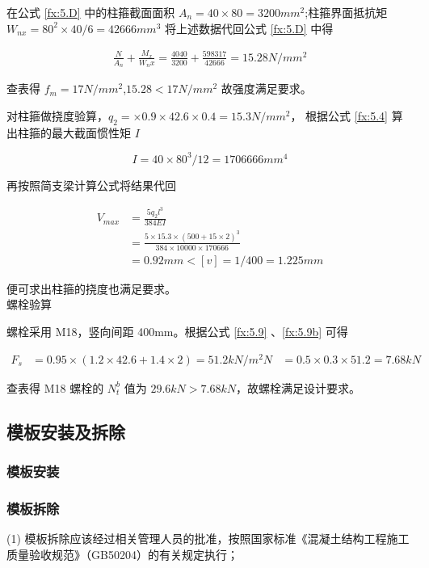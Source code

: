 在公式 \ref{fx:5.D} 中的柱箍截面面积 $A_n=40\times 80=3200 mm^2$;柱箍界面抵抗矩 $W_{nx}=80^2\times 40/6=42666 mm^3$
将上述数据代回公式 \ref{fx:5.D} 中得

\begin{align*}
    \frac{N}{A_n}+\frac{M_x}{W_nx}=\frac{4040}{3200}+\frac{598317}{42666}=15.28 N/mm^2
\end{align*}

查表得 $f_m=17N/mm^2$,$15.28<17N/mm^2$ 故强度满足要求。

对柱箍做挠度验算，$q_2=\times 0.9\times 42.6\times 0.4=15.3 N/mm^2$，
根据公式 \ref{fx:5.4} 算出柱箍的最大截面惯性矩 $I$

\[
    I=40\times 80^3 /12=1706666 mm^4
\]

再按照简支梁计算公式将结果代回

\begin{align*}
    V_{max}&=\frac{5q_2l^3}{384EI}\\
    &=\frac{5\times 15.3\times (500+15\times 2)^3}{384\times 10000\times 170666}\\
    &=0.92mm<[v]=1/400=1.225mm
\end{align*}

便可求出柱箍的挠度也满足要求。\\

 螺栓验算

螺栓采用 M18，竖向间距 400mm。根据公式 \ref{fx:5.9} 、\ref{fx:5.9b} 可得

\begin{align*}
    F_s&=0.95\times(1.2\times 42.6+1.4\times 2)=51.2 kN/m^2
    N&=0.5\times 0.3\times 51.2=7.68 kN
\end{align*}

查表得 M18 螺栓的 $N^b_t$ 值为 $29.6 kN>7.68 kN$，故螺栓满足设计要求。

\subsection{模板安装及拆除}
\subsubsection{模板安装}

\subsubsection{模板拆除}

(1) 模板拆除应该经过相关管理人员的批准，按照国家标准《混凝土结构工程施工质量验收规范》（GB50204）的有关规定执行；


